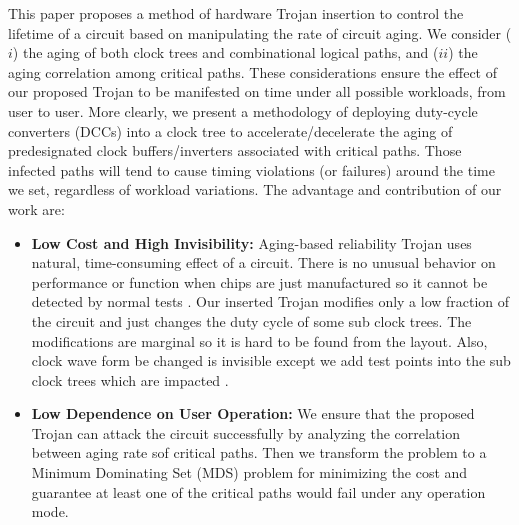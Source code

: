 This paper proposes a method of hardware Trojan insertion to control the lifetime of a circuit based on manipulating the rate of circuit aging. We consider ($i$) the aging of both clock trees and combinational logical paths, and ($ii$) the aging correlation among critical paths. These considerations ensure the effect of our proposed Trojan to be manifested on time under all possible workloads, from user to user. More clearly, we present a methodology of deploying duty-cycle converters (DCCs) into a clock tree to accelerate/decelerate the aging of predesignated clock buffers/inverters associated with critical paths. Those infected paths will tend to cause timing violations (or failures) around the time we set, regardless of workload variations. The advantage and contribution of our work are:
\begin{itemize}
	\item \textbf{Low Cost and High Invisibility:} Aging-based reliability Trojan uses natural, time-consuming effect of a circuit. There is no unusual behavior on performance or function when chips are just manufactured so it cannot be detected by normal tests \cite{sreedhar2012reliability}. Our inserted Trojan modifies only a low fraction of the circuit and just changes the duty cycle of some sub clock trees. The modifications are marginal so it is hard to be found from the layout. Also, clock wave form be changed is invisible except we add test points into the sub clock trees which are impacted \cite{sreedhar2012reliability}.
	\item \textbf{Low Dependence on User Operation:} We ensure that the proposed Trojan can attack the circuit successfully by analyzing the correlation between aging rate sof critical paths. Then we transform the problem to a Minimum Dominating Set (MDS) problem for minimizing the cost and guarantee at least one of the critical paths would fail under any operation mode.
\end{itemize}
